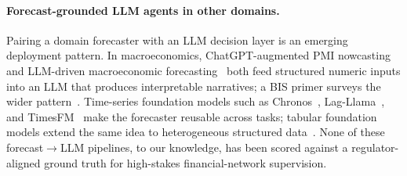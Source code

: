\paragraph{Forecast-grounded LLM agents in other domains.}
Pairing a domain forecaster with an LLM decision layer is an emerging
deployment pattern. In macroeconomics, ChatGPT-augmented PMI
nowcasting~\citep{deBondtSun2025ChatGPTNowcast} and LLM-driven
macroeconomic forecasting~\citep{CarrieroEtAl2024MacroLLM} both feed
structured numeric inputs into an LLM that produces interpretable
narratives; a BIS primer surveys the wider
pattern~\citep{KwonEtAl2024BISLLMprimer}. Time-series foundation
models such as Chronos~\citep{AnsariEtAl2024Chronos},
Lag-Llama~\citep{RasulEtAl2023LagLlama}, and
TimesFM~\citep{DasEtAl2024TimesFM} make the forecaster reusable
across tasks; tabular foundation models extend the same idea to
heterogeneous structured data~\citep{HollmannEtAl2025TabPFN,
eremeev2025turningtabularfoundationmodels}. None of these
forecast$\to$LLM pipelines, to our knowledge, has been scored
against a regulator-aligned ground truth for high-stakes
financial-network supervision.
